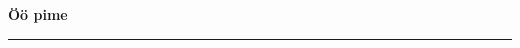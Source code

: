 \documentclass[10pt]{book}
\begin{document}
{
  \samepage
  \raggedbottom
  \raggedright
  \sloppy


  \vspace{0.2in}

  \noindent\begin{minipage}{.1\textwidth}
    \hfill\vspace{0.1in}
  \end{minipage}%
  \noindent\begin{minipage}{.8\textwidth}
    \centering
    \bfseries
    \large \"O\"o pime
  \end{minipage}%
  \noindent\begin{minipage}{.1\textwidth}
      \hfill\vspace{0.1in}
  \end{minipage}

  \nopagebreak[4]
  \vspace{0.1in}
  \nopagebreak[4]
  \hrule height 0.05ex
  \nopagebreak[4]
  \vspace{-0.05in}




}
\end{document}
